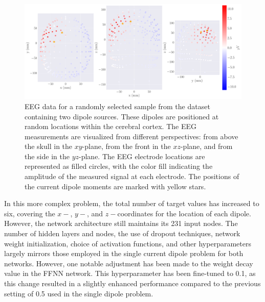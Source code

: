 \documentclass[a4paper, UKenglish, 11pt]{uiomaster}
\begin{document}
\begin{figure}[!htb]
\centering
\includegraphics[width=\linewidth]{figures/NN_two_dipole/dipoles_w_amplitudes_eeg_field_2_0.pdf}
\caption{EEG data for a randomly selected sample from the dataset containing two dipole sources. These dipoles are positioned at random locations within the cerebral cortex. The EEG measurements are visualized from different perspectives: from above the skull in the $xy$-plane, from the front in the $xz$-plane, and from the side in the $yz$-plane. The EEG electrode locations are represented as filled circles, with the color fill indicating the amplitude of the measured signal at each electrode. The positions of the current dipole moments are marked with yellow stars.}
\label{fig:multiple_dipoles_data}
\end{figure}

\FloatBarrier

In this more complex problem, the total number of target values has increased to six, covering the $x-$, $y-$, and $z-$coordinates for the location of each dipole. However, the network architecture still maintains its 231 input nodes. The number of hidden layers and nodes, the use of dropout techniques, network weight initialization, choice of activation functions, and other hyperparameters largely mirrors those employed in the single current dipole problem for both networks. However, one notable adjustment has been made to the weight decay value in the FFNN network. This hyperparameter has been fine-tuned to 0.1, as this change resulted in a slightly enhanced performance compared to the previous setting of 0.5 used in the single dipole problem.
\end{document}
